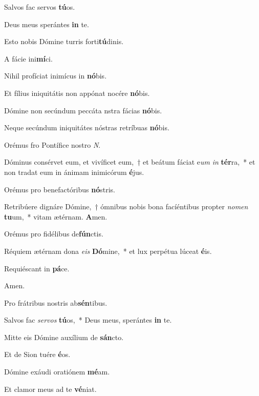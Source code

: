 \item Salvos fac servos \textbf{tú}os.
\item Deus meus sperántes \textbf{in} te.
\item Esto nobis Dómine turris forti\textbf{tú}dinis.
\item A fácie ini\textbf{mí}ci.
\item Nihil profíciat inimícus in \textbf{nó}bis.
\item Et fílius iniquitátis non appónat nocére \textbf{nó}bis.
\item Dómine non secúndum peccáta nstra fácias \textbf{nó}bis.
\item Neque secúndum iniquitátes nóstras retríbuas \textbf{nó}bis.
\item Orémus fro Pontífice nostro \emph{N}.
\item Dóminus consérvet eum, et vivíficet eum,~† et beátum fáciat e\emph{um} \emph{in} \textbf{tér}ra,~* et non tradat eum in ánimam inimicórum \textbf{é}jus.
\item Orémus pro benefactóribus \textbf{nó}stris.
\item Retribúere dignáre Dó\-mi\-ne,~† ómnibus nobis bona fa\-cí\-én\-ti\-bus propter \emph{no}\emph{men} \textbf{tu}\-um,~* vitam ætérnam. \textbf{A}men.
\item Orémus pro fidélibus de\textbf{fún}ctis.
\item Réquiem ætérnam dona \emph{e}\emph{is} \textbf{Dó}mine,~* et lux perpétua lúceat \textbf{é}is.
\item Requiéscant in \textbf{pá}ce.
\item Amen.
\item Pro frátribus nostris ab\textbf{sén}tibus.
\item Salvos fac \emph{ser}\emph{vos} \textbf{tú}os,~* Deus meus, sperántes \textbf{in} te.
\item Mitte eis Dómine auxílium de \textbf{sán}cto.
\item Et de Sion tuére \textbf{é}os.
\item Dómine exáudi oratiónem \textbf{mé}am.
\item Et clamor meus ad te \textbf{vé}niat.
